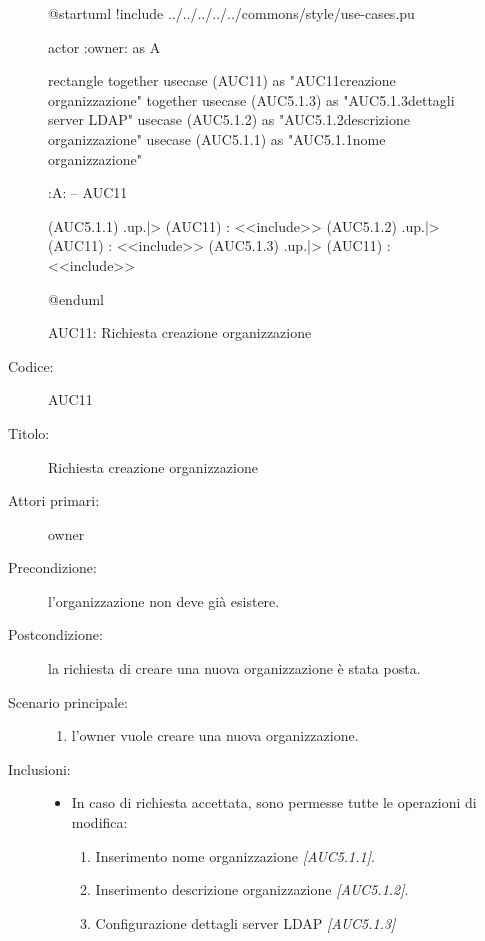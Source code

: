 \documentclass[../../../analisi-dei-requisiti.tex]{subfiles}
\begin{document}
\begin{figure}[H]
  \centering
  \begin{plantuml}
  @startuml
  !include ../../../../../commons/style/use-cases.pu

  actor :owner: as A

  rectangle {
    together {
      usecase (AUC11) as "AUC11\nRichiesta creazione organizzazione"
    }
    together {
      usecase (AUC5.1.3) as "AUC5.1.3\nConfigurazione dettagli server LDAP"
      usecase (AUC5.1.2) as "AUC5.1.2\nInserisci descrizione organizzazione"
      usecase (AUC5.1.1) as "AUC5.1.1\nInserisci nome organizzazione"
    }
  }

  :A: -- AUC11

  (AUC5.1.1) .up.|> (AUC11) : <<include>>
  (AUC5.1.2) .up.|> (AUC11) : <<include>>
  (AUC5.1.3) .up.|> (AUC11) : <<include>>

  @enduml
  \end{plantuml}
  \caption{AUC11: Richiesta creazione organizzazione}%
  \label{fig:auc11}
\end{figure}

\begin{description}
  \item[Codice:] AUC11
  \item[Titolo:] Richiesta creazione organizzazione
  \item[Attori primari:] owner
  \item[Precondizione:] l'organizzazione non deve già esistere.
  \item[Postcondizione:] la richiesta di creare una nuova organizzazione è stata posta.
  \item[Scenario principale:]
  \begin{enumerate}
    \item l'owner vuole creare una nuova organizzazione.
  \end{enumerate}
  \item[Inclusioni:]
  \begin{itemize}
    \item In caso di richiesta accettata, sono permesse tutte le operazioni di modifica:
    \begin{enumerate}
      \item Inserimento nome organizzazione \emph{[AUC5.1.1]}.
      \item Inserimento descrizione organizzazione \emph{[AUC5.1.2]}.
      \item Configurazione dettagli server LDAP \emph{[AUC5.1.3]}
    \end{enumerate}
  \end{itemize}
\end{description}
\end{document}
